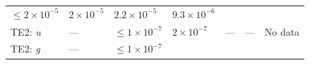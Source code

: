 \documentclass[DM,lsstdraft,toc]{lsstdoc}
\begin{document}
\begin{longtable}[]{@{}lllllll@{}}
\begin{minipage}[t]{0.14\columnwidth}
\(\leq 2\times10^{-5}\)\strut
\end{minipage} & \begin{minipage}[t]{0.14\columnwidth}\raggedright\strut
\(2\times10^{-5}\)\strut
\end{minipage} & \begin{minipage}[t]{0.12\columnwidth}\raggedright\strut
\(2.2\times10^{-5}\)\strut
\end{minipage} & \begin{minipage}[t]{0.12\columnwidth}\raggedright\strut
\(9.3\times10^{-6}\)\strut
\end{minipage} & \begin{minipage}[t]{0.17\columnwidth}\raggedright\strut
\strut
\end{minipage}\tabularnewline
\begin{minipage}[t]{0.12\columnwidth}\raggedright\strut
TE2: \emph{u}\strut
\end{minipage} & \begin{minipage}[t]{0.06\columnwidth}\raggedright\strut
---\strut
\end{minipage} & \begin{minipage}[t]{0.14\columnwidth}\raggedright\strut
\(\leq 1\times10^{-7}\)\strut
\end{minipage} & \begin{minipage}[t]{0.14\columnwidth}\raggedright\strut
\(2\times10^{-7}\)\strut
\end{minipage} & \begin{minipage}[t]{0.12\columnwidth}\raggedright\strut
---\strut
\end{minipage} & \begin{minipage}[t]{0.12\columnwidth}\raggedright\strut
---\strut
\end{minipage} & \begin{minipage}[t]{0.17\columnwidth}\raggedright\strut
No data\strut
\end{minipage}\tabularnewline
\begin{minipage}[t]{0.12\columnwidth}\raggedright\strut
TE2: \emph{g}\strut
\end{minipage} & \begin{minipage}[t]{0.06\columnwidth}\raggedright\strut
---\strut
\end{minipage} & \begin{minipage}[t]{0.14\columnwidth}\raggedright\strut
\(\leq 1\times10^{-7}\)\strut
\end{minipage} & \begin{minipage}[t]{0.14\columnwidth}\raggedright\strut

\end{minipage}
\end{longtable}
\end{document}
